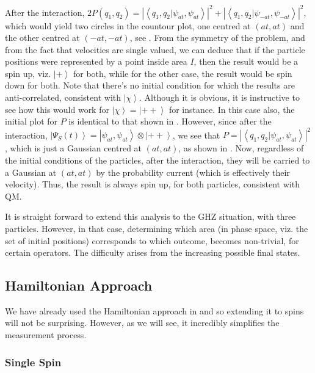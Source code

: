 After the interaction, $2P(q_{1},q_{2})=\left|\left\langle q_{1},q_{2}|\psi_{at},\psi_{at}\right\rangle \right|^{2}+\left|\left\langle q_{1},q_{2}|\psi_{-at},\psi_{-at}\right\rangle \right|^{2}$,
which would yield two circles in the countour plot, one centred at
$(at,at)$ and the other centred at $(-at,-at)$, see .
From the symmetry of the problem, and from the fact that velocities
are single valued, we can deduce that if the particle positions were
represented by a point inside area $I$, then the result would be
a spin up, viz. $\left|+\right\rangle $ for both, while for the other
case, the result would be spin down for both. Note that there's no
initial condition for which the results are anti-correlated, consistent
with $\left|\chi\right\rangle $. Although it is obvious, it is instructive
to see how this would work for $\left|\chi\right\rangle =\left|++\right\rangle $
for instance. In this case also, the initial plot for $P$ is identical
to that shown in . However, since
after the interaction, $\left|\Psi_{S}(t)\right\rangle =\left|\psi_{at},\psi_{at}\right\rangle \otimes\left|++\right\rangle $,
we see that $P=\left|\left\langle q_{1},q_{2}|\psi_{at},\psi_{at}\right\rangle \right|^{2}$,
which is just a Gaussian centred at $(at,at)$, as shown in .
Now, regardless of the initial conditions of the particles, after
the interaction, they will be carried to a Gaussian at $(at,at)$
by the probability current (which is effectively their velocity).
Thus, the result is always spin up, for both particles, consistent
with QM.

It is straight forward to extend this analysis to the GHZ situation,
with three particles. However, in that case, determining which area
(in phase space, viz. the set of initial positions) corresponds to
which outcome, becomes non-trivial, for certain operators. The difficulty
arises from the increasing possible final states. 


\subsection{Hamiltonian Approach\label{sub:BM-Hamiltonian-Approach-Spins}}

We have already used the Hamiltonian approach in 
and so extending it to spins will not be surprising. However, as we
will see, it incredibly simplifies the measurement process.


\subsubsection{Single Spin\label{sub:HamiltonianMeasureSingle-Spin}}

